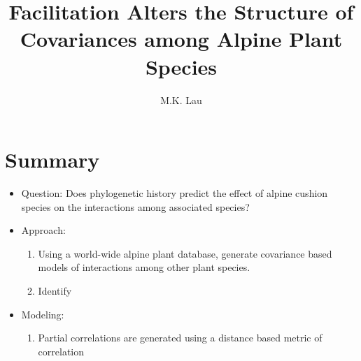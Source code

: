 \documentclass[12pt]{article}
\title{Facilitation Alters the Structure of Covariances among Alpine
  Plant Species}
\author{M.K. Lau}
\begin{document}
\maketitle


\setcounter{tocdepth}{3}
\tableofcontents

\section{Summary}
\begin{itemize}
\item Question: Does phylogenetic history predict the effect of
  alpine cushion species on the interactions among associated species?
\item Approach: 
  \begin{enumerate}
  \item Using a world-wide alpine plant database, generate
  covariance based models of interactions among other plant species.
  \item Identify 
  \end{enumerate}
\item Modeling: 
  \begin{enumerate}
  \item Partial correlations are generated using a distance based
    metric of correlation
  \end{enumerate}
\end{itemize}
\end{document}

